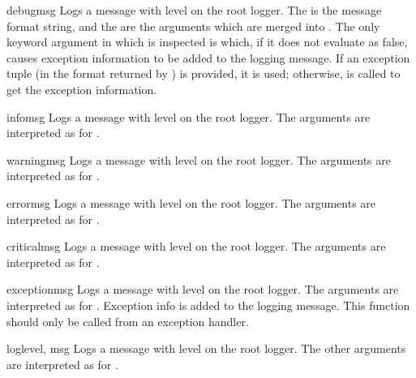 \begin{funcdesc}{debug}{msg}
Logs a message with level  on the root logger.
The  is the message format string, and the  are the
arguments which are merged into . The only keyword argument in
 which is inspected is  which, if it does not
evaluate as false, causes exception information to be added to the logging
message. If an exception tuple (in the format returned by
) is provided, it is used; otherwise,
 is called to get the exception information.
\end{funcdesc}

\begin{funcdesc}{info}{msg}
Logs a message with level  on the root logger.
The arguments are interpreted as for .
\end{funcdesc}

\begin{funcdesc}{warning}{msg}
Logs a message with level  on the root logger.
The arguments are interpreted as for .
\end{funcdesc}

\begin{funcdesc}{error}{msg}
Logs a message with level  on the root logger.
The arguments are interpreted as for .
\end{funcdesc}

\begin{funcdesc}{critical}{msg}
Logs a message with level  on the root logger.
The arguments are interpreted as for .
\end{funcdesc}

\begin{funcdesc}{exception}{msg}
Logs a message with level  on the root logger.
The arguments are interpreted as for . Exception info
is added to the logging message. This function should only be called
from an exception handler.
\end{funcdesc}

\begin{funcdesc}{log}{level, msg}
Logs a message with level  on the root logger.
The other arguments are interpreted as for .
\end{funcdesc}

